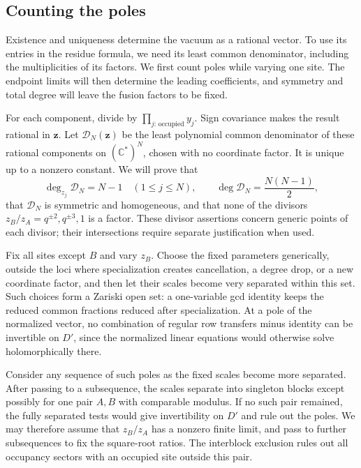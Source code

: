 \subsection{Counting the poles}

Existence and uniqueness determine the vacuum as a rational vector. To use its entries in the residue formula, we need its least common denominator, including the multiplicities of its factors. We first count poles while varying one site. The endpoint limits will then determine the leading coefficients, and symmetry and total degree will leave the fusion factors to be fixed.

For each component, divide by \(\prod_{j:\,\text{occupied}}y_j\). Sign covariance makes the result rational in \(\mathbf z\). Let \(\mathscr D_N(\mathbf z)\) be the least polynomial common denominator of these rational components on \((\mathbb C^*)^N\), chosen with no coordinate factor. It is unique up to a nonzero constant. We will prove that
\[
 \deg_{z_j}\mathscr D_N=N-1\quad(1\le j\le N),\qquad
 \deg\mathscr D_N=\frac{N(N-1)}2,
\]
that \(\mathscr D_N\) is symmetric and homogeneous, and that none of the divisors \(z_B/z_A=q^{\pm2},q^{\pm3},1\) is a factor. These divisor assertions concern generic points of each divisor; their intersections require separate justification when used.

Fix all sites except \(B\) and vary \(z_B\). Choose the fixed parameters generically, outside the loci where specialization creates cancellation, a degree drop, or a new coordinate factor, and then let their scales become very separated within this set. Such choices form a Zariski open set: a one-variable gcd identity keeps the reduced common fractions reduced after specialization. At a pole of the normalized vector, no combination of regular row transfers minus identity can be invertible on \(D'\), since the normalized linear equations would otherwise solve holomorphically there.

Consider any sequence of such poles as the fixed scales become more separated. After passing to a subsequence, the scales separate into singleton blocks except possibly for one pair \(A,B\) with comparable modulus. If no such pair remained, the fully separated tests would give invertibility on \(D'\) and rule out the poles. We may therefore assume that \(z_B/z_A\) has a nonzero finite limit, and pass to further subsequences to fix the square-root ratios. The interblock exclusion rules out all occupancy sectors with an occupied site outside this pair.

